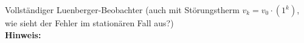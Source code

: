 \begin{question}[section=8,name={Luenberger Beobachter 3},difficulty=,type=mdl,tags={}]
	Vollständiger Luenberger-Beobachter (auch mit Störungstherm $v_k=v_0 \cdot (1^k)$, wie sieht der Fehler im stationären Fall aus?)
	\\ \textbf{Hinweis:}\\
	
\end{question}
\begin{solution}
	
\end{solution}
